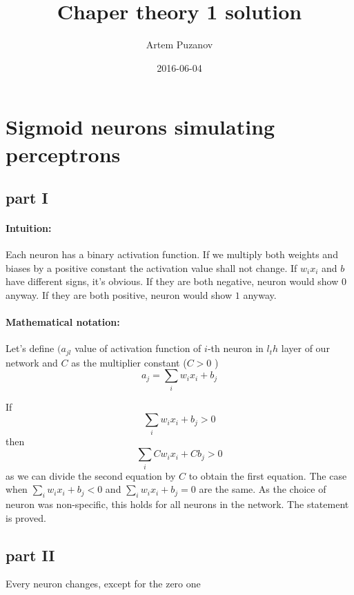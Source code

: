 \documentclass{article}
\title{Chaper theory 1 solution}
\date{2016-06-04}
\author{Artem Puzanov}
\begin{document}
\maketitle
{}
\newpage
{}

\section{Sigmoid neurons simulating perceptrons}
\subsection{part I}
\paragraph{Intuition:} 
Each neuron has a binary activation function. If we multiply both weights and biases by a positive
constant the activation value shall not change. If $w_ix_i$ and $b$ have different signs, it's obvious.
If they are both negative, neuron would show $0$ anyway. If they are both positive, neuron would show
$1$ anyway.
\paragraph{Mathematical notation:} 
Let's define $(a_{jl}$ value of activation function of $i$-th neuron in $l_th$ layer of our network
and $C$ as the multiplier constant ($C > 0$ )
\begin{equation*}
  a_{j} = \sum_{i}w_ix_i + b_j
\end{equation*}

If $$\sum_{i}w_ix_i + b_j > 0$$ then $$\sum_{i}Cw_ix_i + Cb_j > 0$$ as we can divide the second equation by $C$
to obtain the first equation. The case when $\sum_{i}w_ix_i + b_j < 0$ and $\sum_{i}w_ix_i + b_j = 0$ are the same.
As the choice of neuron was non-specific, this holds for all neurons in the network. 
The statement is proved.

\subsection{part II}
Every neuron changes, except for the zero one
\end{document}

